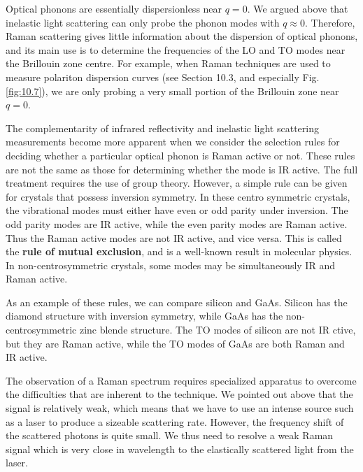 \documentclass[12pt]{book}
\begin{document}
Optical phonons are essentially dispersionless near $q = 0$. We argued above that inelastic light scattering can only probe the phonon modes with $q\approx0$. Therefore, Raman scattering gives little information about the dispersion of optical phonons, and its main use is to determine the frequencies of the LO and TO modes near the Brillouin zone centre. For example, when Raman techniques are used to measure polariton dispersion curves (see Section 10.3, and especially Fig. \ref{fig:10.7}), we are only probing a very small portion of the Brillouin zone near $q = 0$.

The complementarity of infrared reflectivity and inelastic light scattering measurements become more apparent when we consider the selection rules for deciding whether a particular optical phonon is Raman active or not. These rules are not the same as those for determining whether the mode is IR active. The full treatment requires the use of group theory. However, a simple rule can be given for crystals that possess inversion symmetry. In these centro symmetric crystals, the vibrational modes must either have even or odd parity under inversion. The odd parity modes are IR active, while the even parity modes are Raman active. Thus the Raman active modes are not IR active, and vice versa. This is called the \textbf{rule of mutual exclusion}, and is a well-known result in molecular physics. In non-centrosymmetric crystals, some modes may be simultaneously IR and Raman active.

As an example of these rules, we can compare silicon and GaAs. Silicon has the diamond structure with inversion symmetry, while GaAs has the non-centrosymmetric zinc blende structure. The TO modes of silicon are not IR ctive, but they are Raman active, while the TO modes of GaAs are both Raman and IR active.

The observation of a Raman spectrum requires specialized apparatus to overcome the difficulties that are inherent to the technique. We pointed out above that the signal is relatively weak, which means that we have to use an intense source such as a laser to produce a sizeable scattering rate. However, the frequency shift of the scattered photons is quite small. We thus need to resolve a weak Raman signal which is very close in wavelength to the elastically scattered light from the laser.
\end{document}

